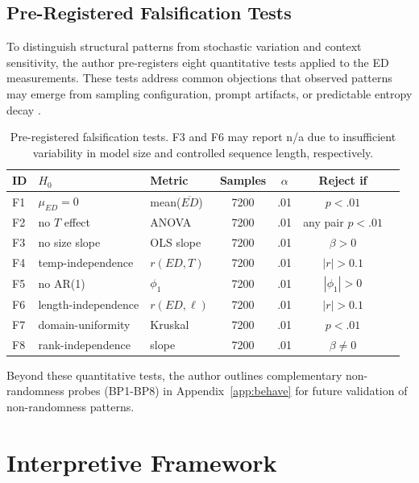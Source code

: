 \documentclass[12pt]{article}
\begin{document}
\subsection{Pre-Registered Falsification Tests}\label{sec:falsify_tests}

To distinguish structural patterns from stochastic variation and context sensitivity, the author pre-registers eight quantitative tests applied to the ED measurements. These tests address common objections that observed patterns may emerge from sampling configuration, prompt artifacts, or predictable entropy decay \citep{srivastava2022beyond, ganguli2022predictability}.

\begin{table}[H]
\centering
\small
\begin{tabular}{llp{2cm}cccp{2.5cm}}
\toprule
ID & $H_0$ & Metric & Samples & $\alpha$ & Reject if \\
\midrule
F1 & $\mu_{ED}=0$            & mean($\overline{ED}$)     & 7200 & .01 & $p<.01$ \\
F2 & no $T$ effect           & ANOVA                     & 7200 & .01 & any pair $p<.01$ \\
F3 & no size slope           & OLS slope                 & 7200 & .01 & $\beta>0$ \\
F4 & temp-independence       & $r(ED,T)$                 & 7200 & .01 & $|r|>0.1$ \\
F5 & no AR(1)                & $\phi_1$                  & 7200 & .01 & $|\phi_1|>0$ \\
F6 & length-independence     & $r(ED,\ell)$              & 7200 & .01 & $|r|>0.1$ \\
F7 & domain-uniformity       & Kruskal                   & 7200 & .01 & $p<.01$ \\
F8 & rank-independence       & slope                     & 7200 & .01 & $\beta\neq0$ \\
\bottomrule
\end{tabular}
\caption{Pre-registered falsification tests. F3 and F6 may report n/a due to insufficient variability in model size and controlled sequence length, respectively.}
\label{tab:falsify}
\end{table}

Beyond these quantitative tests, the author outlines complementary non-randomness probes (BP1-BP8) in Appendix~\ref{app:behave} for future validation of non-randomness patterns.

\section{Interpretive Framework}\label{sec:interpretive}
\end{document}
